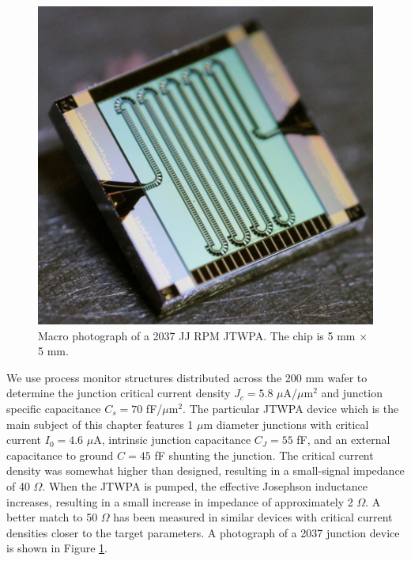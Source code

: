 \begin{figure}
\begin{center}
\includegraphics[width=4.6in]{twpa_exp/chip_pic.png}
\end{center}
\caption[RPM JTWPA chip photograph]{Macro photograph of a 2037 JJ RPM JTWPA.  The chip is 5 mm $\times$ 5 mm.}
\label{fig:chip_pic}
\end{figure}

We use process monitor structures distributed across the 200 mm wafer to determine the junction critical current density $J_c = 5.8$ $\mu$A/$\mu$m$^2$ and junction specific capacitance $C_s = 70$ fF/$\mu$m$^2$.  The particular JTWPA device which is the main subject of this chapter features 1 $\mu$m diameter junctions with critical current $I_0 = 4.6$ $\mu$A, intrinsic junction capacitance $C_J = 55$ fF, and an external capacitance to ground $C = 45$ fF shunting the junction.  The critical current density was somewhat higher than designed, resulting in a small-signal impedance of 40 $\Omega$. When the JTWPA is pumped, the effective Josephson inductance increases, resulting in a small increase in impedance of approximately 2 $\Omega$. A better match to 50 $\Omega$ has been measured in similar devices with critical current densities closer to the target parameters.  A photograph of a 2037 junction device is shown in Figure \ref{fig:chip_pic}.

